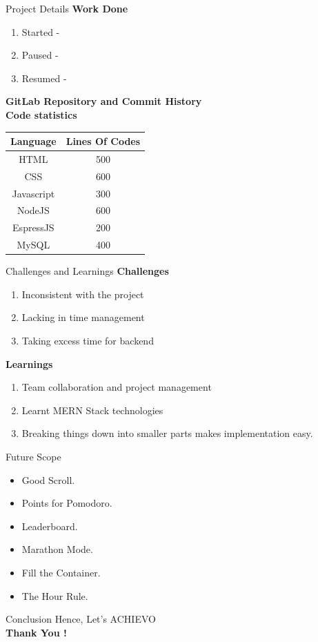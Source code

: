 \documentclass{beamer}
\begin{document}
\begin{frame}{Project Details}
    \textbf{Work Done}
    \begin{enumerate}
        \item Started - 
        \item Paused  - 
        \item Resumed - 
    \end{enumerate}
    \textbf{GitLab Repository and Commit History}
    \bigskip
    \\
    \textbf{Code statistics}
    \begin{table}
        \centering
        \begin{tabular}{cc}
        \hline
        Language & Lines Of Codes \\
        \hline
        HTML & 500 \\
        CSS & 600 \\
        Javascript & 300 \\
        NodeJS & 600 \\
        EspressJS & 200 \\
        MySQL & 400 \\
        \hline
        \end{tabular}
    \end{table}
\end{frame}      

\begin{frame}{Challenges and Learnings}
    \textbf{Challenges}
    \begin{enumerate}
        \item Inconsistent with the project
        \item Lacking in time management
        \item Taking excess time for backend
    \end{enumerate}
    \textbf{Learnings}
    \begin{enumerate}
        \item Team collaboration and project management
        \item Learnt MERN Stack technologies
        \item Breaking things down into smaller parts makes implementation easy.
    \end{enumerate}
\end{frame}

\begin{frame}{Future Scope}
  \begin{itemize}
    \item Good Scroll.
    \item Points for Pomodoro.
    \item Leaderboard.
    \item Marathon Mode.
    \item Fill the Container.
    \item The Hour Rule.
  \end{itemize}
\end{frame}

\begin{frame}{Conclusion}
    \justifying
    \centering
    Hence, Let's ACHIEVO \\
    \bigskip
    \bigskip
    \centering
    \Huge\textbf{Thank You !}
\end{frame}
\end{document}
